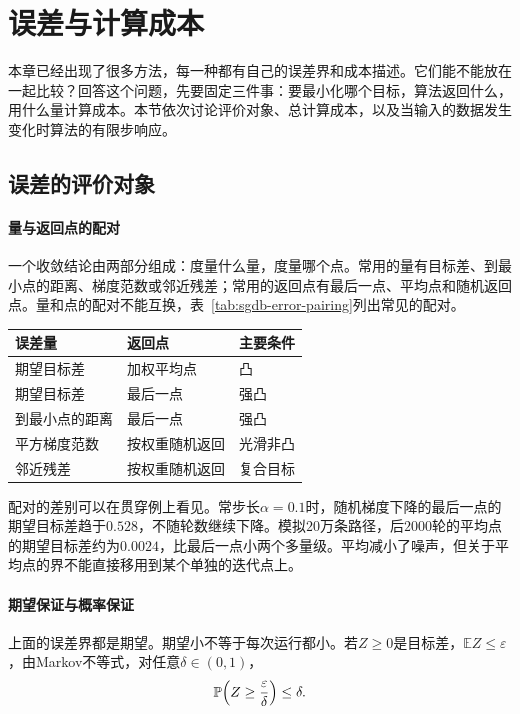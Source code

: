 \section{误差与计算成本}
\label{sec:sgdb-cost}

本章已经出现了很多方法，每一种都有自己的误差界和成本描述。它们能不能放在一起比较？回答这个问题，先要固定三件事：要最小化哪个目标，算法返回什么，用什么量计算成本。本节依次讨论评价对象、总计算成本，以及当输入的数据发生变化时算法的有限步响应。

\subsection{误差的评价对象}
\label{sec:sgdb-error-objects}

\paragraph{量与返回点的配对}
一个收敛结论由两部分组成：度量什么量，度量哪个点。常用的量有目标差、到最小点的距离、梯度范数或邻近残差；常用的返回点有最后一点、平均点和随机返回点。量和点的配对不能互换，表~\ref{tab:sgdb-error-pairing}列出常见的配对。

\begin{BookInlineTable}
  \centering
  \caption{常见的误差量与返回点的配对。条件只列出主要假设，具体常数和步长以相应结论为准。}
  \label{tab:sgdb-error-pairing}
  \begin{tabular}{lll}
    \toprule
    误差量 & 返回点 & 主要条件\\
    \midrule
    期望目标差 & 加权平均点 & 凸\\
    期望目标差 & 最后一点 & 强凸\\
    到最小点的距离 & 最后一点 & 强凸\\
    平方梯度范数 & 按权重随机返回 & 光滑非凸\\
    邻近残差 & 按权重随机返回 & 复合目标\\
    \bottomrule
  \end{tabular}
\end{BookInlineTable}

配对的差别可以在贯穿例上看见。常步长$\alpha=0.1$时，随机梯度下降的最后一点的期望目标差趋于$0.528$，不随轮数继续下降。模拟$20$万条路径，后$2000$轮的平均点的期望目标差约为$0.0024$，比最后一点小两个多量级。平均减小了噪声，但关于平均点的界不能直接移用到某个单独的迭代点上。

\paragraph{期望保证与概率保证}
上面的误差界都是期望。期望小不等于每次运行都小。若$Z\geq0$是目标差，$\mathbb{E}Z\leq\varepsilon$，由Markov不等式，对任意$\delta\in(0,1)$，
\begin{equation}
 \mathbb{P}\Bigl(Z\geq\frac{\varepsilon}{\delta}\Bigr)\leq\delta .
 \label{eq:sgdb-markov}
\end{equation}


